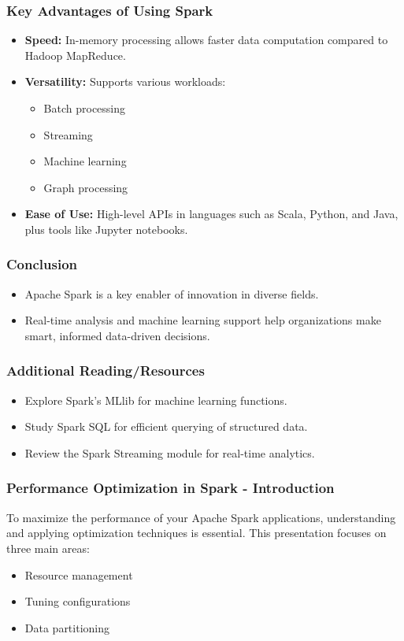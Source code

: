 \documentclass[aspectratio=169]{beamer}
\begin{document}
\begin{frame}[fragile]
    \frametitle{Key Advantages of Using Spark}
    \begin{itemize}
        \item \textbf{Speed:} In-memory processing allows faster data computation compared to Hadoop MapReduce.
        \item \textbf{Versatility:} Supports various workloads: 
            \begin{itemize}
                \item Batch processing
                \item Streaming
                \item Machine learning
                \item Graph processing
            \end{itemize}
        \item \textbf{Ease of Use:} High-level APIs in languages such as Scala, Python, and Java, plus tools like Jupyter notebooks.
    \end{itemize}
\end{frame}

\begin{frame}[fragile]
    \frametitle{Conclusion}
    \begin{itemize}
        \item Apache Spark is a key enabler of innovation in diverse fields.
        \item Real-time analysis and machine learning support help organizations make smart, informed data-driven decisions.
    \end{itemize}
\end{frame}

\begin{frame}[fragile]
    \frametitle{Additional Reading/Resources}
    \begin{itemize}
        \item Explore Spark's MLlib for machine learning functions.
        \item Study Spark SQL for efficient querying of structured data.
        \item Review the Spark Streaming module for real-time analytics.
    \end{itemize}
\end{frame}

\begin{frame}[fragile]
    \frametitle{Performance Optimization in Spark - Introduction}
    To maximize the performance of your Apache Spark applications, understanding and applying optimization techniques is essential. This presentation focuses on three main areas:
    \begin{itemize}
        \item Resource management
        \item Tuning configurations
        \item Data partitioning
    \end{itemize}
\end{frame}
\end{document}
